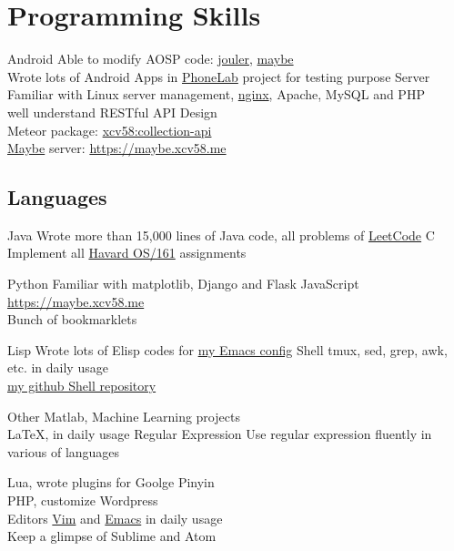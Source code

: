 

\section{Programming Skills}
\cvcomputer
{Android}{
  Able to modify AOSP code:
  \href{http://platform.phone-lab.org:8080/gitweb?p=platform/frameworks/base.git;a=search;h=refs/heads/experiment/1/jouler;s=Yihong+Chen;st=author}{jouler},
  \href{http://platform.phone-lab.org:8080/gitweb?p=platform/frameworks/base.git;a=search;h=refs/heads/experiment/3/maybe;s=Yihong+Chen;st=author}{maybe}
  \\Wrote lots of Android Apps in
  \href{https://phone-lab.org/}{PhoneLab} project for testing purpose
}
{Server}{
  Familiar with Linux server management,
  \href{https://github.com/xcv58/nginx-config}{nginx}, Apache, MySQL and PHP
  \\well understand RESTful API Design
  \\Meteor package:
  \href{https://atmospherejs.com/xcv58/collection-api}{xcv58:collection-api}
  \\\href{http://blue.cse.buffalo.edu/projects/maybe}{Maybe} server: \href{https://maybe.xcv58.me}{https://maybe.xcv58.me}
}

\subsection{Languages}
\cvcomputer
{Java}{
  Wrote more than 15,000 lines of Java code, all problems of
  \href{https://github.com/xcv58/LeetCode}{LeetCode}
}
{C}{
  Implement all \href{http://www.eecs.harvard.edu/~syrah/os161/}{Havard OS/161} assignments
}

\cvcomputer
{Python}{
  Familiar with matplotlib, Django and Flask
}
{JavaScript}{
  \href{https://maybe.xcv58.me}{https://maybe.xcv58.me}\\
  Bunch of bookmarklets\\
}

\cvcomputer
{Lisp}{
  Wrote lots of Elisp codes for \href{https://github.com/xcv58/Emacs_config}{my Emacs config}
}
{Shell}{
  tmux, sed, grep, awk, etc. in daily usage\\
  \href{https://github.com/xcv58/Shell_script}{my github Shell repository}
}

\cvcomputer
{Other}{
  Matlab, Machine Learning projects\\
  {\LaTeX}, in daily usage
}
{Regular Expression}{
  Use regular expression fluently in various of languages
}

\cvcomputer
{}{
  Lua, wrote plugins for Goolge Pinyin\\
  PHP, customize Wordpress\\
}
{Editors}{
  \href{https://github.com/xcv58/Vim_config}{Vim} and
  \href{https://github.com/xcv58/Emacs_config}{Emacs} in daily usage\\
  Keep a glimpse of Sublime and Atom
}
